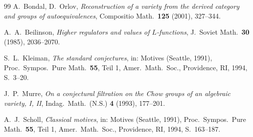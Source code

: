 \documentclass[12pt,a4paper]{amsart}
\theoremstyle{definition}
\begin{document}
\begin{thebibliography}{99}
A.\ Bondal, D.\ Orlov,
\textit{Reconstruction of a variety from the derived category and groups of autoequivalences},
Compositio Math.\ \textbf{125} (2001), 327--344.

A.\ A.\ Beilinson,
\textit{Higher regulators and values of $L$-functions},
J.\ Soviet Math.\ \textbf{30} (1985), 2036--2070.

S.\ L.\ Kleiman,
\textit{The standard conjectures},
in: Motives (Seattle, 1991), Proc.\ Sympos.\ Pure Math.\ \textbf{55}, Teil 1,
Amer.\ Math.\ Soc., Providence, RI, 1994, S.\ 3--20.

J.\ P.\ Murre,
\textit{On a conjectural filtration on the Chow groups of an algebraic variety, I, II},
Indag.\ Math.\ (N.S.) \textbf{4} (1993), 177--201.

A.\ J.\ Scholl,
\textit{Classical motives},
in: Motives (Seattle, 1991), Proc.\ Sympos.\ Pure Math.\ \textbf{55}, Teil 1,
Amer.\ Math.\ Soc., Providence, RI, 1994, S.\ 163--187.

\end{thebibliography}
\end{document}
